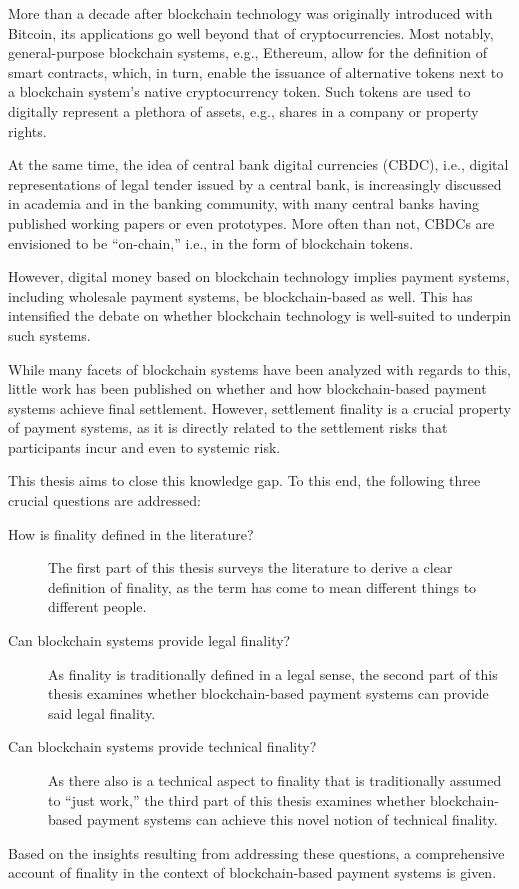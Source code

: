 More than a decade after blockchain technology was originally introduced with Bitcoin, its applications go well beyond that of cryptocurrencies.
Most notably, general-purpose blockchain systems, e.g., Ethereum, allow for the definition of smart contracts, which, in turn, enable the issuance of alternative tokens next to a blockchain system's native cryptocurrency token.
Such tokens are used to digitally represent a plethora of assets, e.g., shares in a company or property rights.

At the same time, the idea of central bank digital currencies (CBDC), i.e., digital representations of legal tender issued by a central bank, is increasingly discussed in academia and in the banking community, with many central banks having published working papers or even prototypes.
More often than not, CBDCs are envisioned to be ``on-chain,'' i.e., in the form of blockchain tokens.

However, digital money based on blockchain technology implies payment systems, including wholesale payment systems, be blockchain-based as well.
This has intensified the debate on whether blockchain technology is well-suited to underpin such systems.

While many facets of blockchain systems have been analyzed with regards to this, little work has been published on whether and how blockchain-based payment systems achieve final settlement.
However, settlement finality is a crucial property of payment systems, as it is directly related to the settlement risks that participants incur and even to systemic risk.

This thesis aims to close this knowledge gap.
To this end, the following three crucial questions are addressed:

\begin{description}
	\item[How is finality defined in the literature?]
		The first part of this thesis surveys the literature to derive a clear definition of finality, as the term has come to mean different things to different people.
	\item[Can blockchain systems provide legal finality?]
		As finality is traditionally defined in a legal sense, the second part of this thesis examines whether blockchain-based payment systems can provide said legal finality.
	\item[Can blockchain systems provide technical finality?]
		As there also is a technical aspect to finality that is traditionally assumed to ``just work,'' the third part of this thesis examines whether blockchain-based payment systems can achieve this novel notion of technical finality.
\end{description}

Based on the insights resulting from addressing these questions, a comprehensive account of finality in the context of blockchain-based payment systems is given.
